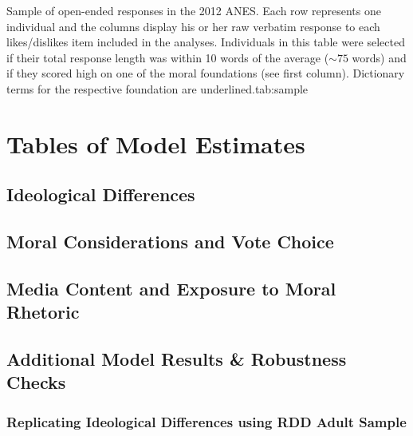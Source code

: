 \documentclass[12pt]{article}
\begin{document}
{\begin{tabular}{ | l | p{2.1cm} | p{2.1cm} | p{2.1cm} | p{2.1cm} | p{2.1cm} | p{2.1cm} | p{2.1cm} | p{2.1cm} | }
    \end{tabular}
}{%
Sample of open-ended responses in the 2012 ANES. Each row represents one individual and the columns display his or her raw verbatim response to each likes/dislikes item included in the analyses. Individuals in this table were selected if their total response length was within 10 words of the average ($\sim75$ words) and if they scored high on one of the moral foundations (see first column). Dictionary terms for the respective foundation are underlined.}{tab:sample}


\clearpage
\section{Tables of Model Estimates}\label{app:tables}
\renewcommand\thefigure{\thesection.\arabic{figure}}
\renewcommand\thetable{\thesection.\arabic{table}}
\setcounter{figure}{0}
\setcounter{table}{0}


\subsection{Ideological Differences}


\clearpage
\subsection{Moral Considerations and Vote Choice}


\clearpage
\subsection{Media Content and Exposure to Moral Rhetoric}


\clearpage
\subsection{Additional Model Results \& Robustness Checks}

\vspace{2em}
\subsubsection*{Replicating Ideological Differences using RDD Adult Sample}


\clearpage
\end{document}
